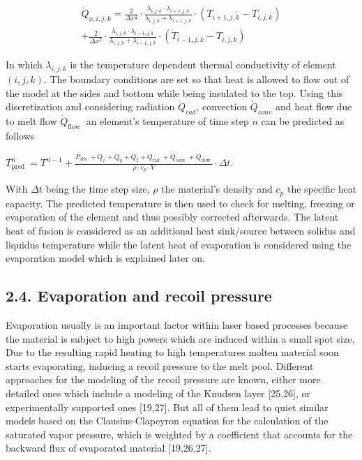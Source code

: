 \documentclass[10pt]{article}
\begin{document}
\begin{gather*}
\dot{Q}_{x, i, j, k}=\frac{2}{\Delta x^{2}} \cdot \frac{\lambda_{i, j, k} \cdot \lambda_{i+1, j, k}}{\lambda_{i, j, k}+\lambda_{i+1, j, k}} \cdot\left(T_{i+1, j, k}-T_{i, j, k}\right) \\
+\frac{2}{\Delta x^{2}} \cdot \frac{\lambda_{i, j, k} \cdot \lambda_{i-1, j, k}}{\lambda_{i, j, k}+\lambda_{i-1, j, k}} \cdot\left(T_{i-1, j, k}-T_{i, j, k}\right) \tag{8}
\end{gather*}


In which $\lambda_{i, j, k}$ is the temperature dependent thermal conductivity of element $(i, j, k)$. The boundary conditions are set so that heat is allowed to flow out of the model at the sides and bottom while being insulated to the top. Using this discretization and considering radiation $\dot{Q}_{r a d}$, convection $\dot{Q}_{c o n v}$ and heat flow due to melt flow $\dot{Q}_{\text {flow }}$ an element's temperature of time step $n$ can be predicted as follows

$T_{\text {pred }}^{n}=T^{n-1}+\frac{P_{\text {abs }}+\dot{Q}_{x}+\dot{Q}_{y}+\dot{Q}_{z}+\dot{Q}_{\text {rad }}+\dot{Q}_{\text {conv }}+\dot{Q}_{\text {flow }}}{\rho \cdot c_{p} \cdot V} \cdot \Delta t$.

With $\Delta t$ being the time step size, $\rho$ the material's density and $c_{p}$ the specific heat capacity. The predicted temperature is then used to check for melting, freezing or evaporation of the element and thus possibly corrected afterwards. The latent heat of fusion is considered as an additional heat sink/source between solidus and liquidus temperature while the latent heat of evaporation is considered using the evaporation model which is explained later on.

\subsection*{2.4. Evaporation and recoil pressure}
Evaporation usually is an important factor within laser based processes because the material is subject to high powers which are induced within a small spot size. Due to the resulting rapid heating to high temperatures molten material soon starts evaporating, inducing a recoil pressure to the melt pool. Different approaches for the modeling of the recoil pressure are known, either more detailed ones which include a modeling of the Knudsen layer [25,26], or experimentally supported ones [19,27]. But all of them lead to quiet similar models based on the Clausius-Clapeyron equation for the calculation of the saturated vapor pressure, which is weighted by a coefficient that accounts for the backward flux of evaporated material [19,26,27].
\end{document}
